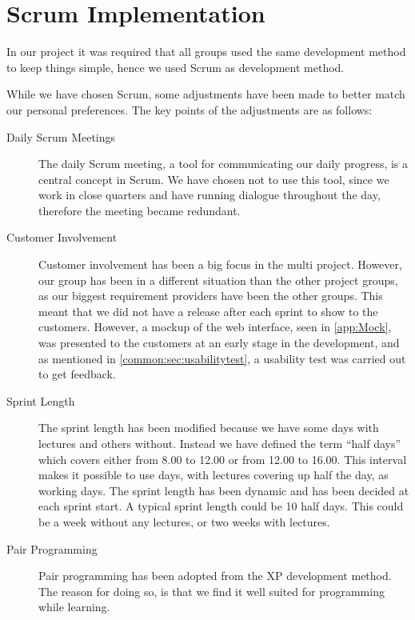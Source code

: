 

\section{Scrum Implementation}
In our project it was required that all groups used the same development method to keep things simple, hence we used Scrum as development method. 

While we have chosen Scrum, some adjustments have been made to better match our personal preferences. 
The key points of the adjustments are as follows:

\begin{description}
\item [Daily Scrum Meetings]
      The daily Scrum meeting, a tool for communicating our daily progress, is a central concept in Scrum. We have chosen not to use this tool, since we work in close quarters and have running dialogue throughout the day, therefore the meeting became redundant.

\item [Customer Involvement]
      Customer involvement has been a big focus in the multi project. However, our group has been in a different situation than the other project groups, as our biggest requirement providers have been the other groups. This meant that we did not have a release after each sprint to show to the customers. However, a mockup of the web interface, seen in \autoref{app:Mock}, was presented to the customers at an early stage in the development, and as mentioned in \autoref{common:sec:usabilitytest}, a usability test was carried out to get feedback. 

\item [Sprint Length]
      The sprint length has been modified because we have some days with lectures and others without. Instead we have defined the term ``half days'' which covers either from 8.00 to 12.00 or from 12.00 to 16.00. This interval makes it possible to use days, with lectures covering up half the day, as working days. The sprint length has been dynamic and has been decided at each sprint start. A typical sprint length could be 10 half days. This could be a week without any lectures, or two weeks with lectures. 

\item [Pair Programming]
      Pair programming has been adopted from the XP development method\cite{larman}. The reason for doing so, is that we find it well suited for programming while learning.

\end{description}







